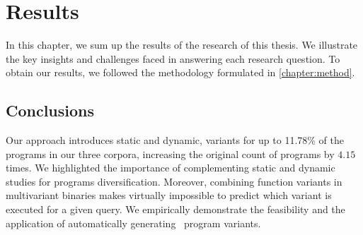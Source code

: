 \chapter{Results} 
\label{chapter:results}

In this chapter, we sum up the results of the research of this thesis. We illustrate the key insights and challenges faced in answering each research question. To obtain our results, we followed the methodology formulated in \autoref{chapter:method}.







\section*{Conclusions}

Our approach introduces static and dynamic, variants for up to 11.78\% of the programs in our three corpora, increasing the original count of programs by $4.15$ times. We highlighted the importance of complementing static and dynamic studies for programs diversification. Moreover, combining function variants in multivariant binaries makes virtually impossible to predict which variant is executed for a given query. We empirically demonstrate the feasibility and the application of automatically generating \wasm\ program variants.

